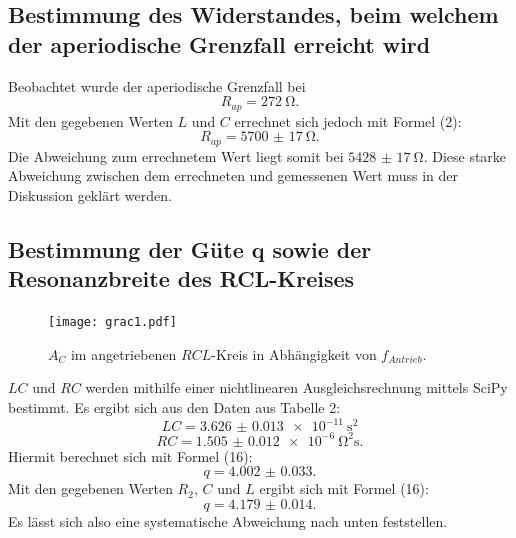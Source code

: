 \subsection{Bestimmung des Widerstandes, beim welchem der aperiodische Grenzfall erreicht wird}
Beobachtet wurde der aperiodische Grenzfall bei
\begin{displaymath}
R_{ap} = \SI{272}{\ohm}\text{.}
\end{displaymath}
Mit den gegebenen Werten $L$ und $C$ errechnet sich jedoch mit Formel (2):
\begin{displaymath}
R_{ap} = \SI{5700(17)}{\ohm}\text{.}
\end{displaymath}
Die Abweichung zum errechnetem Wert liegt somit bei $\SI{5428(17)}{\ohm}$. 
Diese starke Abweichung zwischen dem errechneten und gemessenen Wert muss in der Diskussion geklärt werden.


\subsection{Bestimmung der Güte q sowie der Resonanzbreite des RCL-Kreises}
\begin{figure}[H]
	\centering
	\caption{$A_C$ im angetriebenen $RCL$-Kreis in Abhängigkeit von $f_{Antrieb}$.}
	\texttt{[image: grac1.pdf]}
	\label{fig:grac1}
\end{figure}
$LC$ und $RC$ werden mithilfe einer nichtlinearen Ausgleichsrechnung mittels SciPy \cite{scipy} bestimmt. Es ergibt sich aus den Daten aus Tabelle 2: 
\begin{displaymath}
LC = \SI{3.626(13)e-11}{\second\squared}
\end{displaymath}
\begin{displaymath}
RC = \SI{1.505(12)e-6}{\ohm\squared\second}\text{.}
\end{displaymath}
Hiermit berechnet sich mit Formel (16):
\begin{displaymath}
q = \num{4.002(33)}\text{.}
\end{displaymath}
Mit den gegebenen Werten $R_2$, $C$ und $L$ ergibt sich mit Formel (16):
\begin{displaymath}
q = \num{4.179(14)}\text{.}
\end{displaymath}
Es lässt sich also eine systematische Abweichung  nach unten feststellen.


